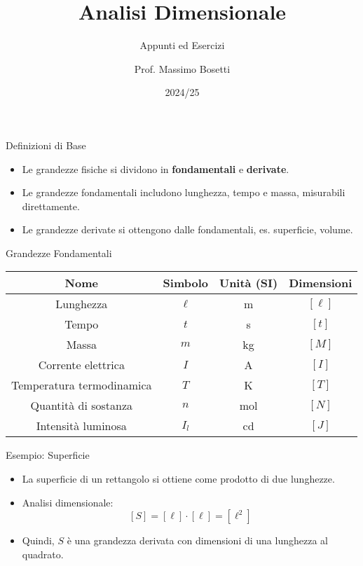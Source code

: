 \documentclass{beamer}
\title{Analisi Dimensionale}
\subtitle{Appunti ed Esercizi} %
\author{Prof. Massimo Bosetti}
\institute{Liceo da Vinci }
\date{2024/25}
\begin{document}
\begin{frame}
    \titlepage
\end{frame}

\begin{frame}{Definizioni di Base}
    \begin{itemize}
        \item Le grandezze fisiche si dividono in \textbf{fondamentali} e \textbf{derivate}.
        \item Le grandezze fondamentali includono lunghezza, tempo e massa, misurabili direttamente.
        \item Le grandezze derivate si ottengono dalle fondamentali, es. superficie, volume.
    \end{itemize}
\end{frame}

\begin{frame}{Grandezze Fondamentali}
    \begin{table}[]
        \centering
        \begin{tabular}{|c|c|c|c|}
            \hline
            Nome & Simbolo & Unità (SI) & Dimensioni \\
            \hline
            Lunghezza & \( \ell \) & m & \([\ell]\) \\
            Tempo & \( t \) & s & \([t]\) \\
            Massa & \( m \) & kg & \([M]\) \\
            Corrente elettrica & \( I \) & A & \([I]\) \\
            Temperatura termodinamica & \( T \) & K & \([T]\) \\
            Quantità di sostanza & \( n \) & mol & \([N]\) \\
            Intensità luminosa & \( I_l \) & cd & \([J]\) \\
            \hline
        \end{tabular}
    \end{table}
\end{frame}


\begin{frame}{Esempio: Superficie}
    \begin{itemize}
        \item La superficie di un rettangolo si ottiene come prodotto di due lunghezze.
        \item Analisi dimensionale:
        \[
        [S] = [\ell] \cdot [\ell] = [\ell^2]
        \]
        \item Quindi, \( S \) è una grandezza derivata con dimensioni di una lunghezza al quadrato.
    \end{itemize}
\end{frame}
\end{document}
